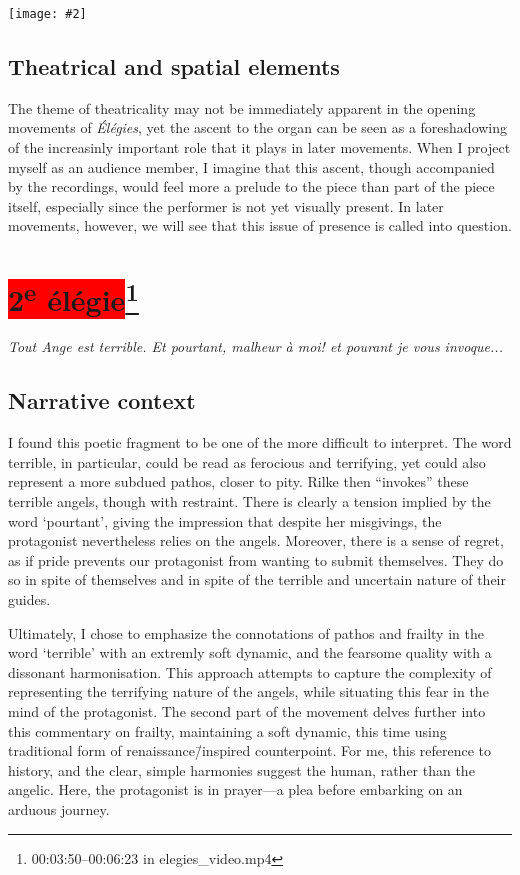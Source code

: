 \documentclass[12pt,twoside,maitrise]{dms_ks}
\newcommand{\customincludeexamples}[4][]{%
    \begin{example}[H]
        \centering
        \texttt{[image: \#2]}
        \caption{#4}
	\label{#3} 
    \end{example}
}
\theoremstyle{definition}
\begin{document}
{{\customincludeexamples[width=\textwidth]{1e_3}{ex:1e_3}{Rising chords based on open fifths and fourths (p.~1, sys.~3).}

\subsection{Theatrical and spatial elements}

The theme of theatricality may not be immediately apparent in the opening movements of \textit{Élégies}, yet the ascent to the organ can be seen as a foreshadowing of the increasinly important role that it plays in later movements.
When I project myself as an audience member, I imagine that this ascent, though accompanied by the recordings, would feel more a prelude to the piece than part of the piece itself, especially since the performer is not yet visually present.
In later movements, however, we will see that this issue of presence is called into question.

\section{\colorbox{red}{2\textsuperscript{e} élégie}\footnote{00:03:50--00:06:23 in elegies\_video.mp4}}

\epigraph{\textit{Tout Ange est terrible. Et pourtant, malheur à moi! et pourant je vous invoque...}}{}

\subsection{Narrative context}

I found this poetic fragment to be one of the more difficult to interpret. 
The word terrible, in particular, could be read as ferocious and terrifying, yet could also represent a more subdued pathos, closer to pity.
Rilke then “invokes” these terrible angels, though with restraint.
There is clearly a tension implied by the word `pourtant', giving the impression that despite her misgivings, the protagonist nevertheless relies on the angels.
Moreover, there is a sense of regret, as if pride prevents our protagonist from wanting to submit themselves.
They do so in spite of themselves and in spite of the terrible and uncertain nature of their guides.

Ultimately, I chose to emphasize the connotations of pathos and frailty in the word `terrible' with an extremly soft dynamic, and the fearsome quality with a dissonant harmonisation.
This approach attempts to capture the complexity of representing the terrifying nature of the angels, while situating this fear in the mind of the protagonist.
The second part of the movement delves further into this commentary on frailty, maintaining a soft dynamic, this time using traditional form of renaissance\=/inspired counterpoint.
For me, this reference to history, and the clear, simple harmonies suggest the human, rather than the angelic.
Here, the protagonist is in prayer---a plea before embarking on an arduous journey.

}}
\end{document}
